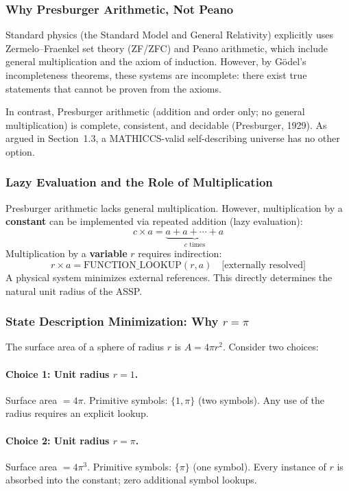 \documentclass[11pt,a4paper]{article}
\begin{document}
\subsubsection{Why Presburger Arithmetic, Not Peano}

Standard physics (the Standard Model and General Relativity) explicitly uses
Zermelo--Fraenkel set theory (ZF/ZFC) and Peano arithmetic, which include general
multiplication and the axiom of induction. However, by G\"odel's incompleteness
theorems, these systems are incomplete: there exist true statements that cannot be
proven from the axioms.

In contrast, Presburger arithmetic (addition and order only; no general
multiplication) is complete, consistent, and decidable (Presburger, 1929). As
argued in Section~1.3, a MATHICCS-valid self-describing universe has no other
option.

\subsubsection{Lazy Evaluation and the Role of Multiplication}

Presburger arithmetic lacks general multiplication. However, multiplication by a
\textbf{constant} can be implemented via repeated addition (lazy evaluation):
\[
  c \times a = \underbrace{a + a + \cdots + a}_{c \text{ times}}
\]
Multiplication by a \textbf{variable} $r$ requires indirection:
\[
  r \times a = \text{FUNCTION\_LOOKUP}(r, a) \quad \text{[externally resolved]}
\]
A physical system minimizes external references. This directly determines the
natural unit radius of the ASSP.

\subsubsection{State Description Minimization: Why $r = \pi$}

The surface area of a sphere of radius $r$ is $A = 4\pi r^2$. Consider two choices:

\paragraph{Choice 1: Unit radius $r = 1$.}
Surface area $= 4\pi$. Primitive symbols: $\{1,\pi\}$ (two symbols). Any use of
the radius requires an explicit lookup.

\paragraph{Choice 2: Unit radius $r = \pi$.}
Surface area $= 4\pi^3$. Primitive symbols: $\{\pi\}$ (one symbol). Every instance
of $r$ is absorbed into the constant; zero additional symbol lookups.
\end{document}
